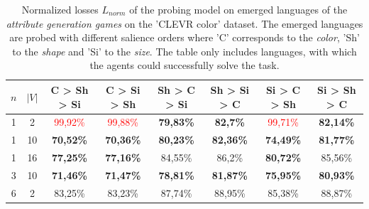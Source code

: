 \begin{table}[ht]
    \centering
    \begin{tabular}{cc|c|c|c|c|c|c}
        \toprule
        $n$ & $|V|$ & \textbf{C > Sh > Si}     & \textbf{C > Si > Sh}     & \textbf{Sh > C > Si} & \textbf{Sh > Si > C} & \textbf{Si > C > Sh}     & \textbf{Si > Sh > C} \\\midrule
        {1} & {2}   & \textcolor{red}{99,92\%} & \textcolor{red}{99,88\%} & \textbf{79,83\%}     & \textbf{82,7\%}      & \textcolor{red}{99,71\%} & \textbf{82,14\%}     \\
        {1} & {10}  & \textbf{70,52\%}         & \textbf{70,36\%}         & \textbf{80,23\%}     & \textbf{82,36\%}     & \textbf{74,49\%}         & \textbf{81,77\%}     \\
        {1} & {16}  & \textbf{77,25\%}         & \textbf{77,16\%}         & {84,55\%}            & {86,2\%}             & \textbf{80,72\%}         & {85,56\%}            \\
        {3} & {10}  & \textbf{71,46\%}         & \textbf{71,47\%}         & \textbf{78,81\%}     & \textbf{81,87\%}     & \textbf{75,95\%}         & \textbf{80,93\%}     \\
        {6} & {2}   & {83,25\%}                & {83,23\%}                & {87,74\%}            & {88,95\%}            & {85,38\%}                & {88,87\%}            \\
        \bottomrule
    \end{tabular}
    \caption{Normalized losses $L_{norm}$ of the probing model on emerged languages of the \emph{attribute generation games} on the 'CLEVR color' dataset. The emerged languages are probed with different salience orders where 'C' corresponds to the \emph{color}, 'Sh' to the \emph{shape} and 'Si' to the \emph{size}. The table only includes languages, with which the agents could successfully solve the task.}
    \label{tab:probing:attribute-generator:colour}
\end{table}

